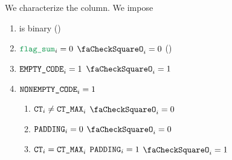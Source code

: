 We characterize the \done{} column. We impose
\begin{enumerate}
    \item \done{} is binary (\sanityCheck)
    \item \If $\flagSum _{i} =    0$ \Then $\done _{i} = 0$ (\sanityCheck)
    \item \If $\texttt{EMPTY\_CODE}    _{i} = 1$ \Then $\done _{i} = 1$
    \item \If $\texttt{NONEMPTY\_CODE} _{i} = 1$ \Then
	\begin{enumerate}
	    \item
		\If   $\texttt{CT}   _{i} \neq \texttt{CT\_MAX} _{i}$
		\Then $\done _{i} =    0$
	    \item
		\If   $\texttt{PADDING} _{i} = 0$
		\Then $\done             _{i} = 0$
	    \item
		\If   $\texttt{CT}               _{i} = \texttt{CT\_MAX} _{i}$
		\et   $\texttt{PADDING} _{i} = 1$
		\Then $\done             _{i} = 1$
	\end{enumerate}
\end{enumerate}
